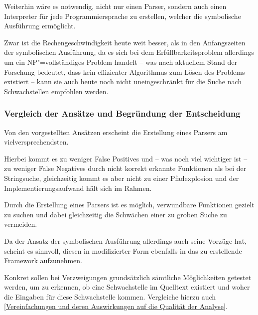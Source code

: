                 Weiterhin wäre es notwendig,
                nicht nur einen Parser,
                sondern auch einen Interpreter für jede Programmiersprache zu erstellen,
                welcher die symbolische Ausführung ermöglicht.

                Zwar ist die Rechengeschwindigkeit heute weit besser,
                als in den Anfangszeiten der symbolischen Ausführung,
                da es sich bei dem Erfüllbarkeitsproblem allerdings um ein
                \gls{NP}"=vollständiges Problem handelt
                -- was nach aktuellem Stand der Forschung bedeutet,
                dass kein effizienter Algorithmus zum Lösen des Problems existiert
                -- kann sie auch heute noch nicht uneingeschränkt für die Suche nach Schwachstellen empfohlen werden.

            \subsubsection{Vergleich der Ansätze und Begründung der Entscheidung}
                Von den vorgestellten Ansätzen erscheint die Erstellung eines Parsers am vielversprechendsten.

                Hierbei kommt es zu weniger False Positives und
                -- was noch viel wichtiger ist
                -- zu weniger False Negatives durch nicht korrekt erkannte Funktionen als bei der Stringsuche,
                gleichzeitig kommt es aber nicht zu einer Pfadexplosion und
                der Implementierungsaufwand hält sich im Rahmen.

                Durch die Erstellung eines Parsers ist es möglich,
                verwundbare Funktionen gezielt zu suchen und
                dabei gleichzeitig die Schwächen einer zu groben Suche zu vermeiden.

                Da der Ansatz der symbolischen Ausführung allerdings auch seine Vorzüge hat,
                scheint es sinnvoll,
                diesen in modifizierter Form ebenfalls in das zu erstellende Framework aufzunehmen.

                Konkret sollen bei Verzweigungen grundsätzlich sämtliche Möglichkeiten getestet werden,
                um zu erkennen,
                ob eine Schwachstelle im Quelltext existiert und
                woher die Eingaben für diese Schwachstelle kommen.
                Vergleiche hierzu auch
                \vref{Vereinfachungen und deren Auswirkungen auf die Qualität der Analyse}.

